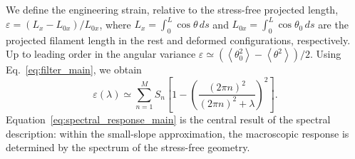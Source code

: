 \documentclass[pdflatex, twocolumn, sn-nature]{sn-jnl}
\begin{document}
We define the engineering strain, relative to the stress-free projected length, $\varepsilon=(L_x-L_{0x})/L_{0x}$, where $L_x=\int_0^L\cos\theta\,ds$ and $L_{0x}=\int_0^L\cos\theta_0\,ds$ are the projected filament length in the rest and deformed configurations, respectively. 
Up to leading order in the angular variance $\varepsilon \simeq \left(
\left\langle\theta_0^2\right\rangle
-
\left\langle\theta^2\right\rangle
\right)/2$.
Using Eq.~\eqref{eq:filter_main}, we obtain
\begin{equation}
\varepsilon(\lambda)
\simeq
\sum_{n=1}^{M}
S_n
\left[
1-
\left(
\frac{(2\pi n)^2}{(2\pi n)^2+\lambda}
\right)^2
\right].
\label{eq:spectral_response_main}
\end{equation}
Equation~\eqref{eq:spectral_response_main} is the central result of the spectral description: within the small-slope approximation, the macroscopic response is determined by the spectrum of the stress-free geometry.
\end{document}
